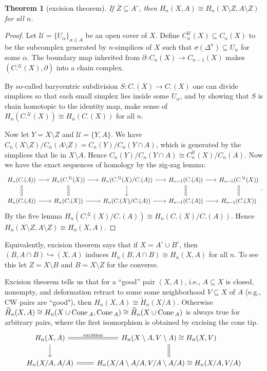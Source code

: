 \documentclass[11pt]{article}
\theoremstyle{definition}
\theoremstyle{plain}
\newtheorem{theorem}{Theorem}[section]
\newcommand{\1}{\mathbf{1}}
\newcommand{\cone}{\textup{Cone}\,}
\begin{document}
\begin{theorem}[excision theorem]
If $\overline{Z}\subseteq A^\circ$, then $H_n(X,A)\cong H_n(X\setminus Z,A\setminus Z)$ for all $n$.
\end{theorem}
\begin{proof}
Let $\mathcal{U}=\{U_\alpha\}_{\alpha\in A}$ be an open cover of $X$. Define $C_n^\mathcal{U}(X)\subseteq C_n(X)$ to be the subcomplex generated by $n$-simplices of $X$ such that $\sigma(\Delta^n)\subseteq U_\alpha$ for some $\alpha$. The boundary map inherited from $\partial:C_n(X)\to C_{n-1}(X)$ makes $(C.^\mathcal{U}(X),\partial)$ into a chain complex.\medbreak

By so-called barycentric subdivision $S:C.(X)\to C.(X)$ one can divide simplices so that each small simplex lies inside some $U_\alpha$, and by showing that $S$ is chain homotopic to the identity map, make sense of $H_n(C.^\mathcal{U}(X))\cong H_n(C.(X))$ for all $n$.\medbreak

Now let $Y=X\setminus Z$ and $\mathcal{U}=\{Y,A\}$. We have $C_n(X\setminus Z)/C_n(A\setminus Z)=C_n(Y)/C_n(Y\cap A)$, which is generated by the simplices that lie in $X\setminus A$. Hence $C_n(Y)/C_n(Y\cap A)\cong C_n^\mathcal{U}(X)/C_n(A)$. Now we have the exact sequences of homology by the zig-zag lemma:
\[\begin{tikzcd}[column sep=scriptsize]
H_n(C.(A))\arrow[equal]{d}\arrow[r]&H_n(C.^\mathcal{U}(X))\arrow[equal]{d}\arrow[r]&H_n(C.^\mathcal{U}(X)/C.(A))\arrow[d]\arrow[r]&H_{n-1}(C.(A))\arrow[equal]{d}\arrow[r]&H_{n-1}(C.^\mathcal{U}(X))\arrow[equal]{d}\\
H_n(C.(A))\arrow[r]&H_n(C.(X))\arrow[r]&H_n(C.(X)/C.(A))\arrow[r]&H_{n-1}(C.(A))\arrow[r]&H_{n-1}(C.(X))
\end{tikzcd}.\]
By the five lemma $H_n(C.^\mathcal{U}(X)/C.(A))\cong H_n(C.(X)/C.(A))$. Hence $H_n(X\setminus Z,A\setminus Z)\cong H_n(X,A)$.
\end{proof}

Equivalently, excision theorem says that if $X=A^\circ\cup B^\circ$, then $(B,A\cap B)\hookrightarrow(X,A)$ induces $H_n(B,A\cap B)\cong H_n(X,A)$ for all $n$. To see this let $Z=X\setminus B$ and $B=X\setminus Z$ for the converse.\medbreak

Excision theorem tells us that for a ``good'' pair $(X,A)$, i.e., $A\subseteq X$ is closed, nonempty, and deformation retract to some some neighborhood $V\subseteq X$ of $A$ (e.g., CW pairs are ``good"), then $H_n(X,A)\cong\widetilde{H}_n(X/A)$. Otherwise $\widetilde{H}_n(X,A)\cong H_n(X\cup\cone_A,\cone_A)\cong\widetilde{H}_n(X\cup\cone_A)$ is always true for arbitrary pairs, where the first isomorphism is obtained by excising the cone tip.
\[\begin{tikzcd}
H_n(X,A)\arrow[equal,r,"\textrm{excision}"]\arrow[d]&H_n(X\setminus A,V\setminus A)\cong H_n(X,V)\arrow[d,equal]\\
H_n(X/A,A/A)\arrow[r,equal]&H_n(X/A\setminus A/A,V/A\setminus A/A)\cong H_n(X/A,V/A)
\end{tikzcd}\]
\end{document}
